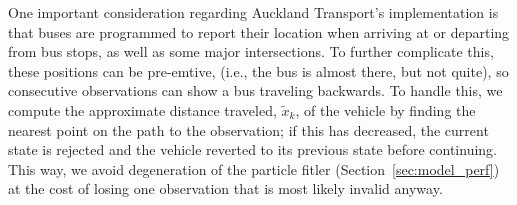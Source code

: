 One important consideration regarding Auckland Transport's \rt implementation is that
buses are programmed to report their location when arriving at or departing from
bus stops, as well as some major intersections.
To further complicate this,
these positions can be pre-emtive,
(i.e., the bus is almost there, but not quite),
so consecutive observations can show a bus traveling backwards.
To handle this, we compute the approximate distance traveled, $\tilde x_k$,
of the vehicle by finding the nearest point on the path to the observation;
if this has decreased, the current state is rejected and the vehicle reverted
to its previous state before continuing.
This way, we avoid degeneration of the particle fitler (Section~\ref{sec:model_perf})
at the cost of losing one observation that is most likely invalid anyway.

